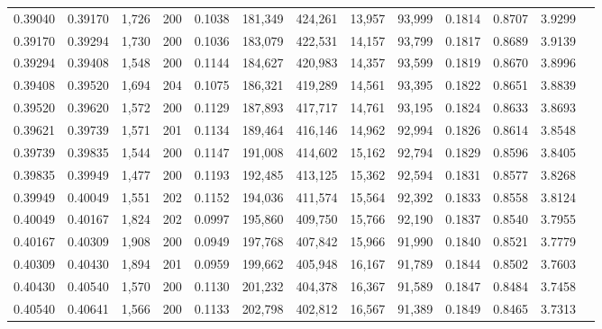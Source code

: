 \begin{tabular}{rrrrrrrrrrrrr}
0.39040 & 0.39170 & 1,726 & 200 &                                     0.1038 & 181,349 & 424,261 &  13,957 &  93,999 & 0.1814 & 0.8707 & 3.9299 \\
0.39170 & 0.39294 & 1,730 & 200 &                                     0.1036 & 183,079 & 422,531 &  14,157 &  93,799 & 0.1817 & 0.8689 & 3.9139 \\
0.39294 & 0.39408 & 1,548 & 200 &                                     0.1144 & 184,627 & 420,983 &  14,357 &  93,599 & 0.1819 & 0.8670 & 3.8996 \\
0.39408 & 0.39520 & 1,694 & 204 &                                     0.1075 & 186,321 & 419,289 &  14,561 &  93,395 & 0.1822 & 0.8651 & 3.8839 \\
0.39520 & 0.39620 & 1,572 & 200 &                                     0.1129 & 187,893 & 417,717 &  14,761 &  93,195 & 0.1824 & 0.8633 & 3.8693 \\
0.39621 & 0.39739 & 1,571 & 201 &                                     0.1134 & 189,464 & 416,146 &  14,962 &  92,994 & 0.1826 & 0.8614 & 3.8548 \\
0.39739 & 0.39835 & 1,544 & 200 &                                     0.1147 & 191,008 & 414,602 &  15,162 &  92,794 & 0.1829 & 0.8596 & 3.8405 \\
0.39835 & 0.39949 & 1,477 & 200 &                                     0.1193 & 192,485 & 413,125 &  15,362 &  92,594 & 0.1831 & 0.8577 & 3.8268 \\
0.39949 & 0.40049 & 1,551 & 202 &                                     0.1152 & 194,036 & 411,574 &  15,564 &  92,392 & 0.1833 & 0.8558 & 3.8124 \\
0.40049 & 0.40167 & 1,824 & 202 &                                     0.0997 & 195,860 & 409,750 &  15,766 &  92,190 & 0.1837 & 0.8540 & 3.7955 \\
0.40167 & 0.40309 & 1,908 & 200 &                                     0.0949 & 197,768 & 407,842 &  15,966 &  91,990 & 0.1840 & 0.8521 & 3.7779 \\
0.40309 & 0.40430 & 1,894 & 201 &                                     0.0959 & 199,662 & 405,948 &  16,167 &  91,789 & 0.1844 & 0.8502 & 3.7603 \\
0.40430 & 0.40540 & 1,570 & 200 &                                     0.1130 & 201,232 & 404,378 &  16,367 &  91,589 & 0.1847 & 0.8484 & 3.7458 \\
0.40540 & 0.40641 & 1,566 & 200 &                                     0.1133 & 202,798 & 402,812 &  16,567 &  91,389 & 0.1849 & 0.8465 & 3.7313 \\

\end{tabular}
